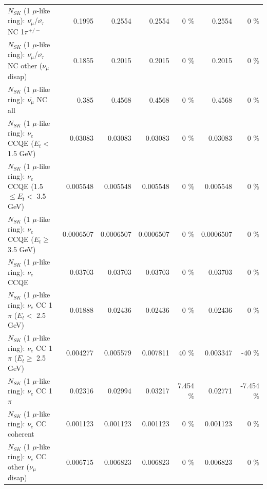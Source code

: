\begin{table}
\begin{tabular}{| l | r | r | r  r | r  r |}
\hline
  $N_{SK}$ (1 $\mu$-like ring): $\bar{\nu_\mu}$/$\bar{\nu_\tau}$ NC 1$\pi^{+/-}$ &          0.1995 &          0.2554 &          0.2554 &        0 \%  &          0.2554 &        0 \%  \\ 
$N_{SK}$ (1 $\mu$-like ring): $\bar{\nu_\mu}$/$\bar{\nu_\tau}$ NC other ($\nu_\mu$ disap) &          0.1855 &          0.2015 &          0.2015 &        0 \%  &          0.2015 &        0 \%  \\ 
                          $N_{SK}$ (1 $\mu$-like ring): $\bar{\nu_{\mu}}$ NC all &           0.385 &          0.4568 &          0.4568 &        0 \%  &          0.4568 &        0 \%  \\ 
\hline
\hline
\hline
                  $N_{SK}$ (1 $\mu$-like ring): $\nu_e$ CCQE ($E_{t} <$ 1.5 GeV) &         0.03083 &         0.03083 &         0.03083 &        0 \%  &         0.03083 &        0 \%  \\ 
         $N_{SK}$ (1 $\mu$-like ring): $\nu_e$ CCQE (1.5 $\leq E_{t} <$ 3.5 GeV) &        0.005548 &        0.005548 &        0.005548 &        0 \%  &        0.005548 &        0 \%  \\ 
               $N_{SK}$ (1 $\mu$-like ring): $\nu_e$ CCQE ($E_{t} \geq$ 3.5 GeV) &       0.0006507 &       0.0006507 &       0.0006507 &        0 \%  &       0.0006507 &        0 \%  \\ 
\hline
                                      $N_{SK}$ (1 $\mu$-like ring): $\nu_e$ CCQE &         0.03703 &         0.03703 &         0.03703 &        0 \%  &         0.03703 &        0 \%  \\ 
\hline
             $N_{SK}$ (1 $\mu$-like ring): $\nu_e$ CC 1$\pi$ ($E_{t} <$ 2.5 GeV) &         0.01888 &         0.02436 &         0.02436 &        0 \%  &         0.02436 &        0 \%  \\ 
          $N_{SK}$ (1 $\mu$-like ring): $\nu_e$ CC 1$\pi$ ($E_{t} \geq$ 2.5 GeV) &        0.004277 &        0.005579 &        0.007811 &       40 \%  &        0.003347 &      -40 \%  \\ 
\hline
                                 $N_{SK}$ (1 $\mu$-like ring): $\nu_e$ CC 1$\pi$ &         0.02316 &         0.02994 &         0.03217 &    7.454 \%  &         0.02771 &   -7.454 \%  \\ 
                               $N_{SK}$ (1 $\mu$-like ring): $\nu_e$ CC coherent &        0.001123 &        0.001123 &        0.001123 &        0 \%  &        0.001123 &        0 \%  \\ 
                $N_{SK}$ (1 $\mu$-like ring): $\nu_e$ CC other ($\nu_\mu$ disap) &        0.006715 &        0.006823 &        0.006823 &        0 \%  &        0.006823 &        0 \%  \\ 

\end{tabular}
\end{table}
